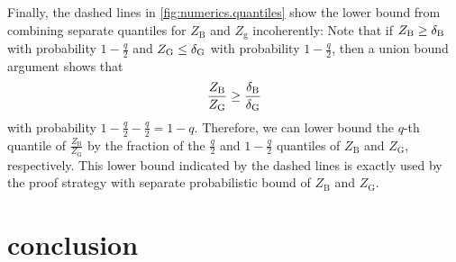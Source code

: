 Finally, the dashed lines in \cref{fig:numerics.quantiles} show the lower bound from combining separate quantiles for $Z_\mathrm{B}$ and $Z_\mathrm{g}$ incoherently:
Note that if $Z_\mathrm{B} \ge \delta_\mathrm{B}$ with probability $1 - \frac{q}{2}$ and $Z_\mathrm{G} \le \delta_\mathrm{G}$ with probability $1 - \frac{q}{2}$, then a union bound argument shows that
\[
  \frac{Z_\mathrm{B}}{Z_\mathrm{G}} \ge \frac{\delta_\mathrm{B}}{\delta_\mathrm{G}}
\]
with probability $1 - \frac{q}{2} - \frac{q}{2} = 1 - q$.
Therefore, we can lower bound the $q$-th quantile of $\frac{Z_\mathrm{B}}{Z_\mathrm{G}}$ by the fraction of the $\frac{q}{2}$ and $1 - \frac{q}{2}$ quantiles of $Z_\mathrm{B}$ and $Z_\mathrm{G}$, respectively.
This lower bound indicated by the dashed lines is exactly used by the proof strategy with separate probabilistic bound of $Z_\mathrm{B}$ and $Z_\mathrm{G}$.\\






















\section{conclusion}
\label{sec:conclusion}



